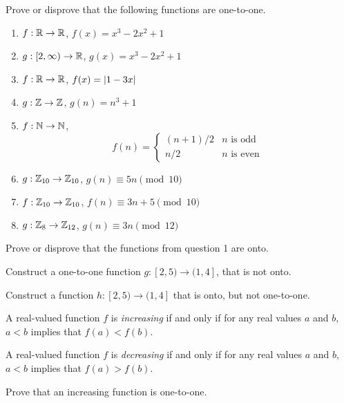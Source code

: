 \documentclass[12pt]{article}
\begin{document}
\begin{qu}
Prove or disprove that the following functions are one-to-one.
\begin{enumerate}[label=\alph*)]
\item $f:\mathbb R \to \mathbb R$, $f(x)=x^3-2x^2+1$
\item $g: [2,\infty) \to \mathbb R$, $g(x)=x^3-2x^2+1$
\item $f:\mathbb R \to \mathbb R$, $f(x)=\left\vert1-3x\right\vert$
\item $g: \mathbb Z \to \mathbb Z$, $g(n)=n^3+1$
\item $f: \mathbb N \to \mathbb N$, \[f(n)=\begin{cases}
(n+1)/2 & n \textrm{ is odd} \\
n/2 & n \textrm{ is even}
\end{cases} \]
\item $g:\mathbb Z_{10} \to \mathbb Z_{10}$, $g(n)\equiv 5n \pmod{10}$
\item $f:\mathbb Z_{10} \to \mathbb Z_{10}$, $f(n)\equiv 3n+5 \pmod{10}$
\item $g:\mathbb Z_{8} \to \mathbb Z_{12}$, $g(n)\equiv 3n \pmod{12}$
\end{enumerate}
\end{qu}

\begin{qu}
Prove or disprove that the functions from question 1 are onto.
\vspace*{24pt}
\end{qu}

\begin{qu}
Construct a one-to-one function $g: [2, 5) \to (1, 4]$, that is not onto.
\end{qu}

\begin{qu}
Construct a function $h: [2, 5) \to (1, 4]$ that is onto, but not one-to-one.
\end{qu}


\begin{defn}
A real-valued function $f$ is \emph{increasing} if and only if for any real values $a$ and $b$, $a<b$ implies that $f(a)<f(b)$.
\end{defn}

\begin{defn}
A real-valued function $f$ is \emph{decreasing} if and only if for any real values $a$ and $b$, $a<b$ implies that $f(a)>f(b)$.
\end{defn}

\begin{qu}
Prove that an increasing function is one-to-one.
\end{qu}
\end{document}
